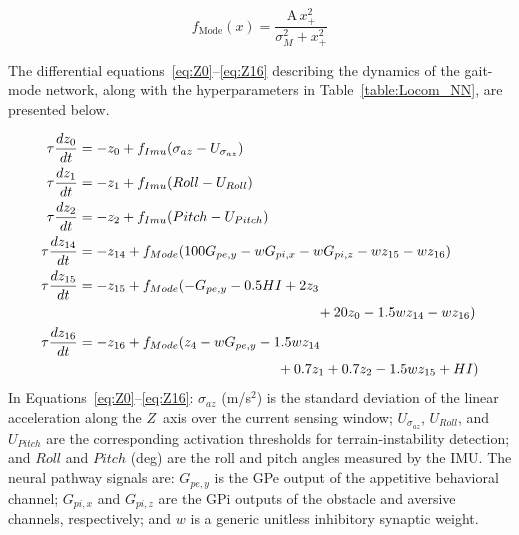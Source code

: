 \documentclass[preprint,12pt]{elsarticle}
\begin{document}
\begin{equation}
f_{\mathrm{Mode}}(x) = \frac{\mathrm{A}\, x_+^2}{\sigma_{M}^2 + x_+^2}
\label{eq:NakaMode}
\end{equation}


The differential equations~\eqref{eq:Z0}–\eqref{eq:Z16} describing the dynamics of the gait-mode network, along with the hyperparameters in Table~\ref{table:Locom_NN}, are presented below. 

\begin{align}
\tau \frac{dz_0}{dt} &= -z_0 + f_{Imu}(\sigma_{az} - U_{\sigma_{az}})
\label{eq:Z0}
\\
\tau \frac{dz_1}{dt} &= -z_1 +  f_{Imu}( Roll - U_{Roll})
\\
\tau \frac{dz_2}{dt} &= -z_2 +  f_{Imu}( Pitch - U_{Pitch})
\\
\tau \frac{dz_{14}}{dt} &= -z_{14} +  f_{Mode}(100 G_{pe,y} - w G_{pi,x}  - w G_{pi,z} - w z_{15} - w z_{16})
\\
\tau \frac{dz_{15}}{dt} &= -z_{15} +f_{Mode}( -G_{pe,y} - 0.5HI + 2z_3 \notag\\
&\hspace*{6cm}+ 20z_0 - 1.5wz_{14} - wz_{16})
\\
\tau \frac{dz_{16}}{dt} &= -z_{16} +  f_{Mode}( z_4 - wG_{pe,y} - 1.5wz_{14}\notag\\
&\hspace{5cm}+ 0.7z_1 + 0.7z_2 - 1.5wz_{15} + HI)
\label{eq:Z16}
\end{align}
In Equations~\eqref{eq:Z0}–\eqref{eq:Z16}: $\sigma_{az}$ (m/s$^2$) is the standard deviation of the linear acceleration along the $Z$~axis over the current sensing window; $U_{\sigma_{az}}$, $U_{Roll}$, and $U_{Pitch}$ are the corresponding activation thresholds for terrain-instability detection; and $Roll$ and $Pitch$ (deg) are the roll and pitch angles measured by the IMU.
The neural pathway signals are: $G_{pe,y}$ is the GPe output of the appetitive behavioral channel; $G_{pi,x}$ and $G_{pi,z}$ are the GPi outputs of the obstacle and aversive channels, respectively; and $w$ is a generic unitless inhibitory synaptic weight. %
\end{document}
